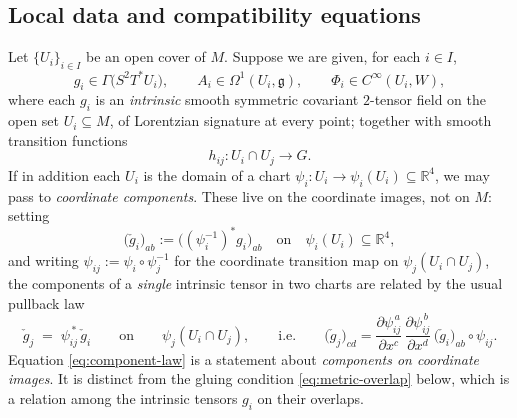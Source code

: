 \documentclass[11pt,a4paper]{article}
\theoremstyle{plain}
\theoremstyle{definition}
\theoremstyle{remark}
\newcommand{\Real}{\mathbb{R}}
\newcommand{\gfrak}{\mathfrak{g}}
\begin{document}
\subsection{Local data and compatibility equations}

Let $\{U_i\}_{i\in I}$ be an open cover of $M$. Suppose we are given, for each $i\in I$,
\begin{equation}
\label{eq:local-data}
g_i\in\Gamma\bigl(S^2T^*U_i\bigr),
\qquad
A_i\in\Omega^1(U_i,\gfrak),
\qquad
\Phi_i\in C^\infty(U_i,W),
\end{equation}
where each $g_i$ is an \emph{intrinsic} smooth symmetric covariant $2$-tensor field on the open
set $U_i\subseteq M$, of Lorentzian signature at every point; together with smooth transition
functions
\begin{equation}
\label{eq:transition}
h_{ij}\colon U_i\cap U_j\longrightarrow G .
\end{equation}
If in addition each $U_i$ is the domain of a chart $\psi_i\colon U_i\to\psi_i(U_i)\subseteq\Real^4$,
we may pass to \emph{coordinate components}. These live on the coordinate images, not on $M$:
setting
\begin{equation}
\label{eq:components}
\bigl(\check g_i\bigr)_{ab}
:=\bigl((\psi_i^{-1})^*g_i\bigr)_{ab}
\quad\text{on}\quad \psi_i(U_i)\subseteq\Real^4 ,
\end{equation}
and writing $\psi_{ij}:=\psi_i\circ\psi_j^{-1}$ for the coordinate transition map on
$\psi_j(U_i\cap U_j)$, the components of a \emph{single} intrinsic tensor in two charts are
related by the usual pullback law
\begin{equation}
\label{eq:component-law}
\check g_j \;=\; \psi_{ij}^{\,*}\,\check g_i
\qquad\text{on}\qquad \psi_j(U_i\cap U_j),
\qquad\text{i.e.}\qquad
\bigl(\check g_j\bigr)_{cd}
=\frac{\partial \psi_{ij}^{\,a}}{\partial x^{c}}\,
 \frac{\partial \psi_{ij}^{\,b}}{\partial x^{d}}\,
 \bigl(\check g_i\bigr)_{ab}\circ\psi_{ij}.
\end{equation}
Equation \eqref{eq:component-law} is a statement about \emph{components on coordinate images}. It
is distinct from the gluing condition \eqref{eq:metric-overlap} below, which is a relation among the
intrinsic tensors $g_i$ on their overlaps.
\end{document}
